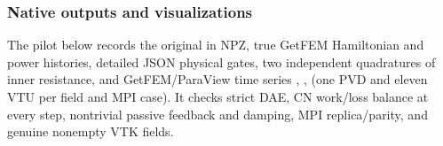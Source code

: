 \documentclass[letterpaper,10pt,english]{sphinxmanual}
\begin{document}
\begin{sphinxVerbatim}[commandchars=\\\{\}]
      \PYG{p}{[}
          \PYG{p}{[} \PYG{p}{]}
          \PYG{p}{[} \PYG{p}{]}
    \PYG{p}{]}
       

     


\end{sphinxVerbatim}


\subsubsection{Native outputs and visualizations}
\label{\detokenize{examples/wave_coenergy:native-outputs-and-visualizations}}
\sphinxAtStartPar
The pilot below records the original  in NPZ, true GetFEM Hamiltonian and power
histories, detailed JSON physical gates, two independent
quadratures of inner resistance, and GetFEM/ParaView
time series , ,  (one PVD and eleven VTU
per field and MPI case). It checks strict DAE, CN
work/loss balance at every step, nontrivial passive
feedback and damping, MPI replica/parity, and genuine
nonempty VTK fields.
\end{document}
